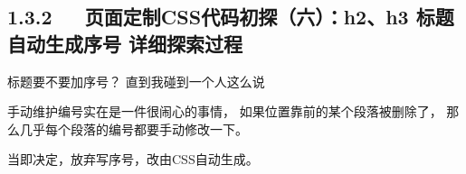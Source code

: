 \documentclass[letterpaper,12pt,english]{sphinxmanual}
\begin{document}
\subsection{1.3.2   页面定制CSS代码初探（六）：h2、h3 标题自动生成序号 详细探索过程}
\label{\detokenize{000misc/extract:css-h2h3}}
标题要不要加序号？ 直到我碰到一个人这么说

\begin{sphinxVerbatim}[commandchars=\\\{\}]
手动维护编号实在是一件很闹心的事情， 如果位置靠前的某个段落被删除了， 那么几乎每个段落的编号都要手动修改一下。
\end{sphinxVerbatim}

当即决定，放弃写序号，改由CSS自动生成。

\end{document}
